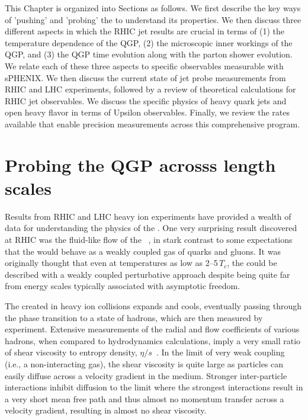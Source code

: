 This Chapter is organized into Sections as follows.  We first describe
the key ways of 'pushing' and 'probing' the \qgp to understand its
properties.  We then discuss three different aspects in which the RHIC
jet results are crucial in terms of (1) the temperature dependence of
the QGP, (2) the microscopic inner workings of the QGP, and (3) the
QGP time evolution along with the parton shower evolution.  We relate each
of these three aspects to specific observables measurable with sPHENIX.  We then
discuss the current state of jet probe measurements from RHIC and LHC
experiments, followed by a review of theoretical calculations for RHIC
jet observables.  We discuss the specific physics of heavy quark jets and open
heavy flavor in terms of Upsilon observables.   Finally, we review the rates available
that enable precision measurements across this comprehensive program.

\section{Probing the QGP acrosss length scales}

Results from RHIC and LHC heavy ion experiments have provided a wealth
of data for understanding the physics of the \qgp.  One very
surprising result discovered at RHIC was the fluid-like flow of the
\qgp~\cite{Adcox:2004mh}, in stark contrast to some expectations that
the \qgp would behave as a weakly coupled gas of quarks and gluons.
It was originally thought that even at temperatures as low as
2--5\,$T_{c}$, the \qgp could be described with a weakly coupled
perturbative approach despite being quite far from energy scales
typically associated with asymptotic freedom.  

The \qgp created in heavy ion collisions expands and cools, eventually passing through the
phase transition to a state of hadrons, which are then measured by
experiment.  Extensive measurements of the radial and flow coefficients of
various hadrons, when compared to hydrodynamics calculations, imply a very
small ratio of shear viscosity to entropy density,
$\eta/s$~\cite{Luzum:2008cw}.  In the limit of very weak coupling
(i.e., a non-interacting gas), the shear viscosity is quite large as
particles can easily diffuse across a velocity gradient in the medium.
Stronger inter-particle interactions inhibit diffusion to the limit
where the strongest interactions result in a very short mean free path
and thus almost no momentum transfer across a velocity gradient,
resulting in almost no shear viscosity.  

